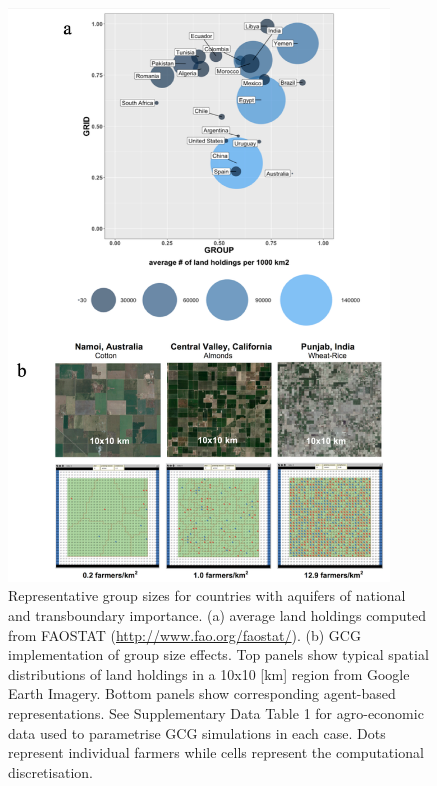 \documentclass[12pt, a4paper]{article}
\begin{document}
\begin{figure} \caption{Representative group sizes for countries with aquifers of national and transboundary importance. (a) average land holdings computed from FAOSTAT (\url{http://www.fao.org/faostat/}). (b) GCG implementation of group size effects. Top panels show typical spatial distributions of land holdings in a 10x10 [km] region from Google Earth Imagery. Bottom panels show corresponding agent-based representations. See Supplementary Data Table 1 for agro-economic data used to parametrise GCG simulations in each case. Dots represent individual farmers while cells represent the computational discretisation.} \label{fig: CH3_GCG1_Representative group sizes}  \includegraphics[width=0.9\textwidth]{Figures/CH3_Methods_Fig3} \end{figure} 
\end{document}
